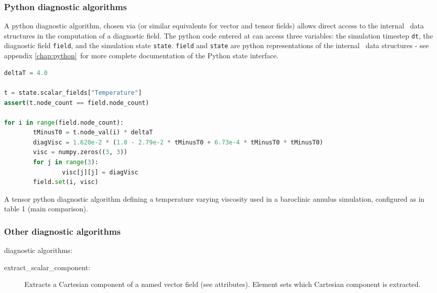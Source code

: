 \subsubsection{Python diagnostic algorithms}

A python diagnostic algorithm, chosen via 
(or similar equivalents for vector and tensor fields) allows direct access to the
internal \fluidity\ data structures in the computation of a diagnostic field. The
python code entered at 
can access three variables: the simulation timestep \lstinline[language = Python]*dt*,
the diagnostic field \lstinline[language = Python]*field*, and the simulation state
\lstinline[language = Python]*state*. \lstinline[language = Python]*field* and
\lstinline[language = Python]*state* are python representations of the internal
\fluidity\ data structures - see appendix \ref{chap:python}\ for more
complete documentation of the Python state interface.

\begin{example}
\begin{lstlisting}[language = Python]
deltaT = 4.0

t = state.scalar_fields["Temperature"]
assert(t.node_count == field.node_count)

for i in range(field.node_count):
        tMinusT0 = t.node_val(i) * deltaT
        diagVisc = 1.620e-2 * (1.0 - 2.79e-2 * tMinusT0 + 6.73e-4 * tMinusT0 * tMinusT0)
        visc = numpy.zeros((3, 3))
        for j in range(3):
                visc[j][j] = diagVisc
        field.set(i, visc)
\end{lstlisting}
\caption{A tensor python diagnostic algorithm defining a temperature varying
         viscosity used in a baroclinic annulus simulation, configured
         as in \citet{hignett1985} table 1 (main comparison).}
\end{example}

\subsubsection{Other diagnostic algorithms}

 diagnostic algorithms:

\begin{description}
\item[extract\_scalar\_component:] Extracts a Cartesian component of a
  named vector field (see attributes). Element  sets 
  which Cartesian component is extracted.
\end{description}

